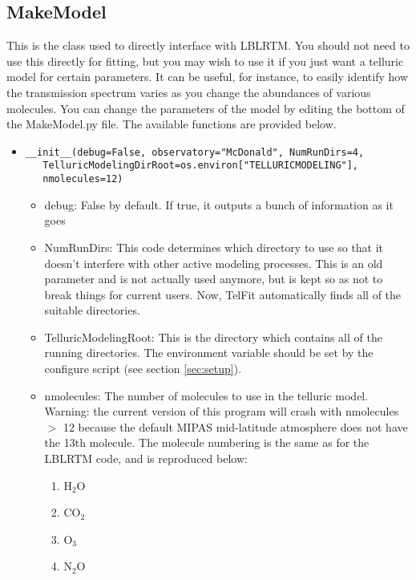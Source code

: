 \documentclass{article}
\begin{document}
\subsection{MakeModel}
\label{subsec:makemodel}
This is the class used to directly interface with LBLRTM. You should not need to use this directly for fitting, but you may wish to use it if you just want a telluric model for certain parameters. It can be useful, for instance, to easily identify how the transmission spectrum varies as you change the abundances of various molecules. You can change the parameters of the model by editing the bottom of the MakeModel.py file. The available functions are provided below.

\begin{itemize}
\item \begin{Verbatim}[commandchars=\\\{\}]
__init__(debug=False, observatory="McDonald", NumRunDirs=4,
   TelluricModelingDirRoot=os.environ["TELLURICMODELING"], 
   nmolecules=12)
\end{Verbatim}
  \begin{itemize}
  \item debug: False by default. If true, it outputs a bunch of information as it goes
  \item NumRunDirs: This code determines which directory to use so that it doesn't interfere with other active modeling processes. This is an old parameter and is not actually used anymore, but is kept so as not to break things for current users. Now, TelFit automatically finds all of the suitable directories.
  \item TelluricModelingRoot: This is the directory which contains all of the running directories. The environment variable should be set by the configure script (see section \ref{sec:setup}).
  \item nmolecules: The number of molecules to use in the telluric model. Warning: the current version of this program will crash with nmolecules $>$ 12 because the default MIPAS mid-latitude atmosphere does not have the 13th molecule. The molecule numbering is the same as for the LBLRTM code, and is reproduced below:
  \begin{enumerate}
                \item   H$_2$O
                \item   CO$_2$
                \item   O$_3$
                \item   N$_2$O

\end{enumerate}
\end{itemize}
\end{itemize}
\end{document}
